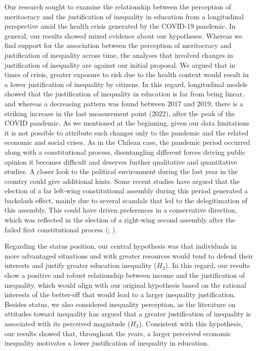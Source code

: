 \documentclass[
  12pt,
  a4paper,
]{article}
\begin{document}
Our research sought to examine the relationship between the perception of meritocracy and the justification of inequality in education from a longitudinal perspective amid the health crisis generated by the COVID-19 pandemic. In general, our results showed mixed evidence about our hypotheses. Whereas we find support for the association between the perception of meritocracy and justification of inequality across time, the analyses that involved changes in justification of inequality are against our initial proposal. We argued that in times of crisis, greater exposure to risk due to the health context would result in a lower justification of inequality by citizens. In this regard, longitudinal models showed that the justification of inequality in education is far from being linear, and whereas a decreasing pattern was found between 2017 and 2019, there is a striking increase in the last measurement point (2022), after the peak of the COVID pandemic. As we mentioned at the beginning, given our data limitations it is not possible to attribute such changes only to the pandemic and the related economic and social crises. As in the Chilean case, the pandemic period occurred along with a constitutional process, disentangling different forces driving public opinion it becomes difficult and deserves further qualitative and quantitative studies. A closer look to the political environment during the last year in the country could give additional hints. Some recent studies have argued that the election of a far left-wing constitutional assembly during this period generated a backslash effect, mainly due to several scandals that led to the delegitimation of this assembly. This could have driven preferences in a conservative direction, which was reflected in the election of a right-wing second assembly after the failed first constitutional process (; ).

Regarding the status position, our central hypothesis was that individuals in more advantaged situations and with greater resources would tend to defend their interests and justify greater education inequality (\(H_2\)). In this regard, our results show a positive and robust relationship between income and the justification of inequality, which would align with our original hypothesis based on the rational interests of the better-off that would lead to a larger inequality justification. Besides status, we also considered inequality perception, as the literature on attitudes toward inequality has argued that a greater justification of inequality is associated with its perceived magnitude (\(H_3\)). Consistent with this hypothesis, our results showed that, throughout the years, a larger perceived economic inequality motivates a lower justification of inequality in education.
\end{document}
